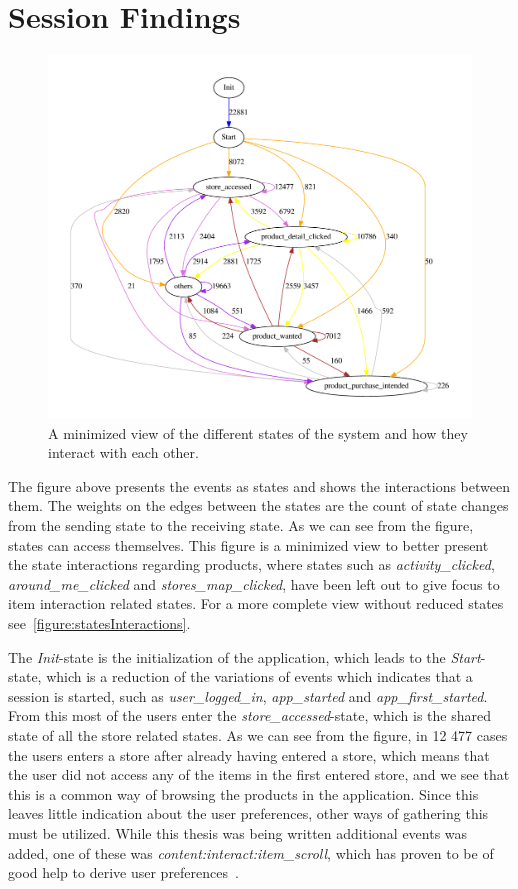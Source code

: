 \section{Session Findings}
    \label{sec:sessionFindings}
    \begin{figure}[H]
        \includegraphics[width=5in]{image/statesInteractionTrue-gvfile.pdf}
        \centering
        \caption{A minimized view of the different states of the system and how they interact with each other.}
        \label{figure:minStatesInteractions}
    \end{figure}
        The figure above presents the events as states and shows the interactions between them.
        The weights on the edges between the states are the count of state changes from the sending state to the receiving state.
        As we can see from the figure, states can access themselves.
        This figure is a minimized view to better present the state interactions regarding products, where states such as \emph{activity\_clicked}, \emph{around\_me\_clicked} and \emph{stores\_map\_clicked}, have been left out to give focus to item interaction related states.
        For a more complete view without reduced states see~\ref{figure:statesInteractions}.

        The \emph{Init}-state is the initialization of the application, which leads to the \emph{Start}-state, which is a reduction of the variations of events which indicates that a session is started, such as \emph{user\_logged\_in}, \emph{app\_started} and \emph{app\_first\_started}.
        From this most of the users enter the \emph{store\_accessed}-state, which is the shared state of all the store related states.
        As we can see from the figure, in 12 477 cases the users enters a store after already having entered a store, which means that the user did not access any of the items in the first entered store, and we see that this is a common way of browsing the products in the application. Since this leaves little indication about the user preferences, other ways of gathering this must be utilized.
        While this thesis was being written additional events was added, one of these was \emph{content:interact:item\_scroll}, which has proven to be of good help to derive user preferences~\cite{Claypool01inferringuser}.

